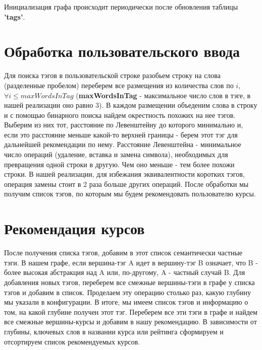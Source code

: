 \documentclass[12pt]{article}
\begin{document}
Инициализация графа происходит периодически после обновления таблицы \textbf{'tags'}.

\section*{Обработка пользовательского ввода}
Для поиска тэгов в пользовательской строке разобьем строку на слова (разделенные пробелом) переберем все размещения из количества слов по $i$, $\forall i \leq maxWordsInTag$ (\textbf{maxWordsInTag} - максимальное число слов в тэге, в нашей реализации оно равно $3$). \newline
В каждом размещении объеденим слова в строку и с помощью бинарного поиска найдем окрестность похожих на нее тэгов. Выберим из них тот, расстояние по Левенштейну до которого минимально и, если это расстояние меньше какой-то верхней границы - берем этот тэг для дальнейшей рекомендации по нему. \newline
Расстояние Левенштейна - минимальное число операций (удаление, вставка и замена символа), необходимых для превращения одной строки в другую. Чем оно меньше - тем более похожи строки. В нашей реализации, для избежания эквивалентности коротких тэгов, операция замены стоит в 2 раза больше других операций. \newline
После обработки мы получим список тэгов, по которым мы будем рекомендовать пользователю курсы. \newline

\section*{Рекомендация курсов}
После получения списка тэгов, добавим в этот список семантически частные тэги. \newline
В нашем графе, если вершина-тэг A идет в вершину-тэг B означает, что B - более высокая абстракция над A или, по-другому, A - частный случай B. \newline
Для добавления новых тэгов, переберем все смежные вершины-тэги в графе у списка тэгов и добавим в список. Проделаем эту операцию столько раз, какую глубину мы указали в конфигурации. \newline
В итоге, мы имеем список тэгов и информацию о том, на какой глубине получен этот тэг. Переберем все эти тэги в графе и найдем все смежные вершины-курсы и добавим в нашу рекомендацию. В зависимости от глубины, ключевых слов в названии курса или рейтинга сформируем и отсортируем список рекомендуемых курсов.
\end{document}
